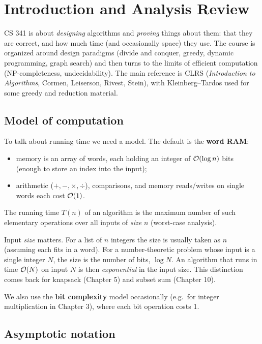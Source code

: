 \chapter{Introduction and Analysis Review}

CS 341 is about \emph{designing} algorithms and \emph{proving} things about them:
that they are correct, and how much time (and occasionally space) they use.
The course is organized around design paradigms (divide and conquer, greedy,
dynamic programming, graph search) and then turns to the limits of efficient
computation (NP-completeness, undecidability). The main reference is CLRS
(\emph{Introduction to Algorithms}, Cormen, Leiserson, Rivest, Stein), with
Kleinberg--Tardos used for some greedy and reduction material.

\section{Model of computation}

To talk about running time we need a model. The default is the \textbf{word RAM}:
\begin{itemize}
  \item memory is an array of words, each holding an integer of $\mathcal{O}(\log n)$ bits
        (enough to store an index into the input);
  \item arithmetic ($+,-,\times,\div$), comparisons, and memory reads/writes on single
        words each cost $\mathcal{O}(1)$.
\end{itemize}
The running time $T(n)$ of an algorithm is the maximum number of such elementary
operations over all inputs of \emph{size} $n$ (worst-case analysis).

\begin{remark}
Input \emph{size} matters. For a list of $n$ integers the size is usually taken
as $n$ (assuming each fits in a word). For a number-theoretic problem whose input is a
single integer $N$, the size is the number of bits, $\log N$. An algorithm that
runs in time $\mathcal{O}(N)$ on input $N$ is then \emph{exponential} in the input size.
This distinction comes back for knapsack (Chapter 5) and subset sum (Chapter 10).
\end{remark}

We also use the \textbf{bit complexity} model occasionally (e.g.\ for integer
multiplication in Chapter 3), where each bit operation costs 1.

\section{Asymptotic notation}

